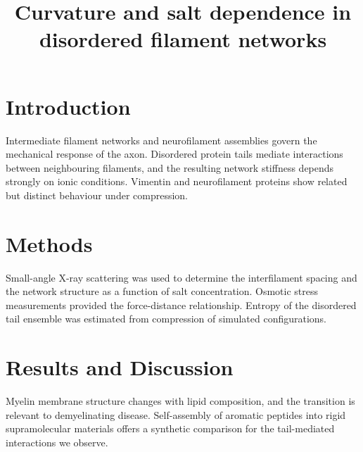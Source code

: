 \documentclass{article}
\begin{document}
\title{Curvature and salt dependence in disordered filament networks}

\section{Introduction}
Intermediate filament networks and neurofilament assemblies govern the mechanical
response of the axon. Disordered protein tails mediate interactions between
neighbouring filaments, and the resulting network stiffness depends strongly on
ionic conditions. Vimentin and neurofilament proteins show related but distinct
behaviour under compression.

\section{Methods}
Small-angle X-ray scattering was used to determine the interfilament spacing and the
network structure as a function of salt concentration. Osmotic stress measurements
provided the force-distance relationship. Entropy of the disordered tail ensemble was
estimated from compression of simulated configurations.

\section{Results and Discussion}
Myelin membrane structure changes with lipid composition, and the transition is
relevant to demyelinating disease. Self-assembly of aromatic peptides into rigid
supramolecular materials offers a synthetic comparison for the tail-mediated
interactions we observe.
\end{document}

